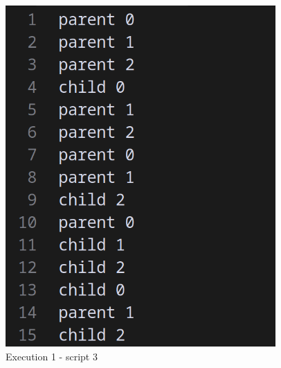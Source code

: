 \documentclass[12pt]{article}
\begin{document}
\begin{figure}[h]
    \centering
    \begin{minipage}{0.45\textwidth}
        \centering
        \includegraphics[width=\linewidth]{images/outfile1-script3.png}
        \caption{Execution 1 - script 3}
    \end{minipage}
    \hfill %
    \begin{minipage}{0.45\textwidth}
        \centering

\end{minipage}
\end{figure}
\end{document}
